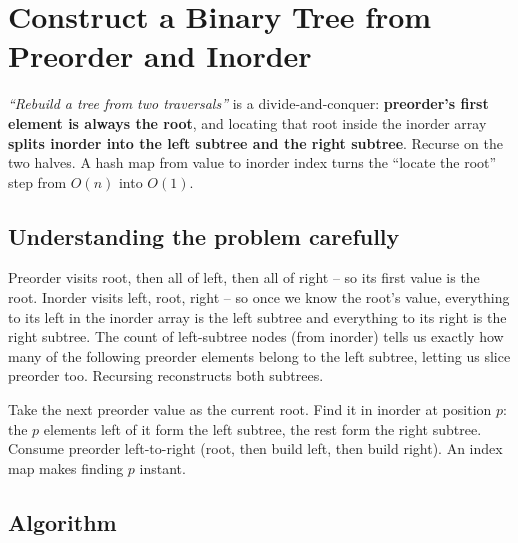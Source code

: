 \section{Construct a Binary Tree from Preorder and Inorder}
\label{sec:trees-construct-pre-in}


\begin{patternbox}
\emph{``Rebuild a tree from two traversals''} is a divide-and-conquer:
\textbf{preorder's first element is always the root}, and locating that
root inside the inorder array \textbf{splits inorder into the left subtree
and the right subtree}. Recurse on the two halves. A hash map from value to
inorder index turns the ``locate the root'' step from $O(n)$ into $O(1)$.
\end{patternbox}

\subsection*{Understanding the problem carefully}

Preorder visits root, then all of left, then all of right -- so its first
value is the root. Inorder visits left, root, right -- so once we know the
root's value, everything to its left in the inorder array is the left
subtree and everything to its right is the right subtree. The count of
left-subtree nodes (from inorder) tells us exactly how many of the
following preorder elements belong to the left subtree, letting us slice
preorder too. Recursing reconstructs both subtrees.

\begin{ideabox}
Take the next preorder value as the current root. Find it in inorder at
position $p$: the $p$ elements left of it form the left subtree, the rest
form the right subtree. Consume preorder left-to-right (root, then build
left, then build right). An index map makes finding $p$ instant.
\end{ideabox}

\subsection*{Algorithm}

